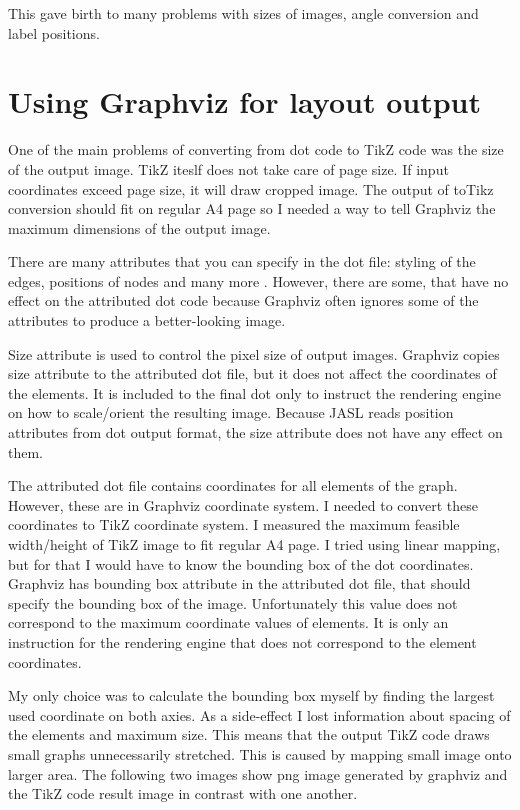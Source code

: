 \documentclass{ctuthesis}
\begin{document}
This gave birth to many problems with sizes of images, angle conversion and label positions. 

\section{Using Graphviz for layout output}
\label{sec:problems_graphviz}
One of the main problems of converting from dot code to TikZ code was the size of the output image. 
TikZ iteslf does not take care of page size. If input coordinates exceed page size, it will draw cropped image. The output of toTikz conversion should fit on regular A4 page so I needed a way to tell Graphviz the maximum dimensions of the output image.

There are many attributes that you can specify in the dot file: styling of the edges, positions of nodes and many more \cite{dot-notation}. However, there are some, that have no effect on the attributed dot code because Graphviz often ignores some of the attributes to produce a better-looking image.

Size attribute is used to control the pixel size of output images. Graphviz copies size attribute to the attributed dot file, but it does not affect the coordinates of the elements. It is included to the final dot only to instruct the rendering engine on how to scale/orient the resulting image. Because JASL reads position attributes from dot output format, the size attribute does not have any effect on them.

The attributed dot file contains coordinates for all elements of the graph. However, these are in Graphviz coordinate system. I needed to convert these coordinates to TikZ coordinate system. I measured the maximum feasible width/height of TikZ image to fit regular A4 page. I tried using linear mapping, but for that I would have to know the bounding box of the dot coordinates. Graphviz has bounding box attribute in the attributed dot file, that should specify the bounding box of the image. Unfortunately this value does not correspond to the maximum coordinate values of elements. It is only an instruction for the rendering engine that does not correspond to the element coordinates.

My only choice was to calculate the bounding box myself by finding the largest used coordinate on both axies. As a side-effect I lost information about spacing of the elements and maximum size. This means that the output TikZ code draws small graphs unnecessarily stretched. This is caused by mapping small image onto larger area. The following two images show png image generated by graphviz and the TikZ code result image in contrast with one another. 
\end{document}
